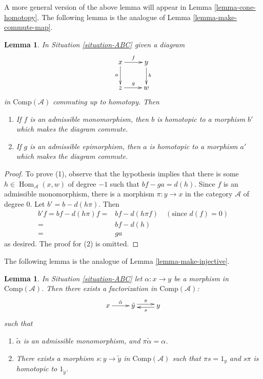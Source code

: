 \documentclass{stacks-project}
\theoremstyle{plain}
\newtheorem{lemma}[subsection]{Lemma}
\theoremstyle{definition}
\theoremstyle{remark}
\numberwithin{equation}{subsection}
\def\Hom{\mathop{\mathrm{Hom}}\nolimits}
\begin{document}
\noindent
A more general version of the above lemma will appear in
Lemma \ref{lemma-cone-homotopy}. The following lemma is the
analogue of Lemma \ref{lemma-make-commute-map}.

\begin{lemma}
\label{lemma-homo-change}
In Situation \ref{situation-ABC} given a diagram
$$
\xymatrix{x\ar[r]^f\ar[d]_a & y\ar[d]^b\\
z\ar[r]^g & w}
$$
in $\text{Comp}(\mathcal{A})$ commuting up to homotopy. Then
\begin{enumerate}
\item If $f$ is an admissible monomorphism, then $b$ is homotopic
to a morphism $b'$ which makes the diagram commute.
\item If $g$ is an admissible epimorphism, then $a$ is homotopic
to a morphism $a'$ which makes the diagram commute.
\end{enumerate}
\end{lemma}

\begin{proof}
To prove (1), observe that the hypothesis implies that there is some
$h\in\Hom_{\mathcal{A}}(x,w)$ of degree $-1$ such that $bf-ga=d(h)$.
Since $f$ is an admissible monomorphism, there is a morphism
$\pi : y \to x$ in the category $\mathcal{A}$ of degree $0$.
Let $b' = b - d(h\pi)$. Then
\begin{align*}
b'f = bf - d(h\pi)f
= &
bf - d(h\pi f) \quad (\text{since }d(f) = 0) \\
= &
bf-d(h) \\
= &
ga
\end{align*}
as desired. The proof for (2) is omitted.
\end{proof}

\noindent
The following lemma is the analogue of Lemma \ref{lemma-make-injective}.

\begin{lemma}
\label{lemma-factor}
In Situation \ref{situation-ABC} let $\alpha : x \to y$
be a morphism in $\text{Comp}(\mathcal{A})$. Then there exists
a factorization in $\text{Comp}(\mathcal{A})$:
$$
\xymatrix{
x \ar[r]^{\tilde{\alpha}}  &
\tilde{y} \ar@<0.5ex>[r]^{\pi} &
y\ar@<0.5ex>[l]^s
}
$$
such that
\begin{enumerate}
\item $\tilde{\alpha}$ is an admissible monomorphism, and
$\pi\tilde{\alpha}=\alpha$.
\item There exists a morphism
$s:y\to\tilde{y}$ in $\text{Comp}(\mathcal{A})$
such that $\pi s=1_y$ and $s\pi$ is homotopic to $1_{\tilde{y}}$. 
\end{enumerate}
\end{lemma}
\end{document}
